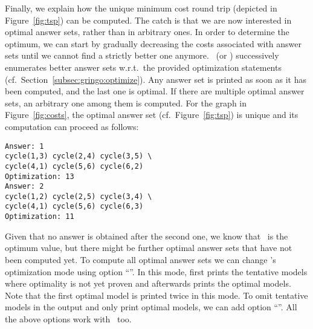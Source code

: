 Finally, we explain how the unique minimum cost round trip
(depicted in Figure~\ref{fig:tsp}) can be computed.
The catch is that we are now interested in optimal answer sets,
rather than in arbitrary ones.
In order to determine the optimum, we can start by gradually
decreasing the costs associated with answer sets
until we cannot find a strictly better one anymore.
\clasp\ (or \clingo) successively enumerates better answer sets
w.r.t.\ the provided optimization statements (cf.\ Section~\ref{subsec:gringo:optimize}).
Any answer set is printed as soon as it has been computed,
and the last one is optimal.
If there are multiple optimal answer sets, an arbitrary one among them is computed.
For the graph in Figure~\ref{fig:costs},
the optimal answer set (cf.\ Figure~\ref{fig:tsp}) is unique
and its computation can proceed as follows:%
%
\begin{lstlisting}[numbers=none]
Answer: 1
cycle(1,3) cycle(2,4) cycle(3,5) \
cycle(4,1) cycle(5,6) cycle(6,2)
Optimization: 13
Answer: 2
cycle(1,2) cycle(2,5) cycle(3,4) \
cycle(4,1) cycle(5,6) cycle(6,3)
Optimization: 11
\end{lstlisting}
%
Given that no answer is obtained after the second one,
we know that~ is the optimum value,
but there might be further optimal answer sets that have not been computed yet.
To compute all optimal answer sets we can change \clasp's optimization mode using option
``\code{--opt-mode=optN}''.
In this mode, \clasp first prints the tentative models where optimality is not yet proven and afterwards prints the optimal models.
Note that the first optimal model is printed twice in this mode.
To omit tentative models in the output and only print optimal models, we can add option 
``\code{--quiet=1}''.
All the above options work with \clingo\ too.


